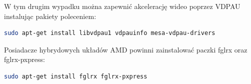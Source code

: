 W tym drugim wypadku można zapewnić akcelerację wideo poprzez VDPAU instalując pakiety poleceniem:
\begin{lstlisting}[language=bash]
sudo apt-get install libvdpau1 vdpauinfo mesa-vdpau-drivers
\end{lstlisting}

Posiadacze hybrydowych układów AMD powinni zainstalować paczki fglrx oraz fglrx-pxpress:

\begin{lstlisting}[language=bash]
sudo apt-get install fglrx fglrx-pxpress
\end{lstlisting}